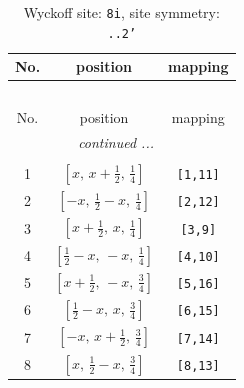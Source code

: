 \documentclass[fleqn,8pt]{jsarticle}
\begin{document}
\begin{longtable}{ccc}
\caption{Wyckoff site: {\tt 8i}, site symmetry: {\tt ..2'}}
 \\
 \hline \hline
No. & position & mapping \\ \hline \endfirsthead

\multicolumn{2}{l}{\tablename\ \thetable{}} \\
 \hline \hline
No. & position & mapping \\ \hline \endhead

 \hline \hline
\multicolumn{2}{r}{\footnotesize\it continued ...} \\ \endfoot

 \hline \hline
\multicolumn{2}{r}{} \\ \endlastfoot

1 & $\left[ x,\, x + \frac{1}{2},\, \frac{1}{4} \right]$ & {\tt [1,11]} \\ \hline
2 & $\left[ - x,\, \frac{1}{2} - x,\, \frac{1}{4} \right]$ & {\tt [2,12]} \\ \hline
3 & $\left[ x + \frac{1}{2},\, x,\, \frac{1}{4} \right]$ & {\tt [3,9]} \\ \hline
4 & $\left[ \frac{1}{2} - x,\, - x,\, \frac{1}{4} \right]$ & {\tt [4,10]} \\ \hline
5 & $\left[ x + \frac{1}{2},\, - x,\, \frac{3}{4} \right]$ & {\tt [5,16]} \\ \hline
6 & $\left[ \frac{1}{2} - x,\, x,\, \frac{3}{4} \right]$ & {\tt [6,15]} \\ \hline
7 & $\left[ - x,\, x + \frac{1}{2},\, \frac{3}{4} \right]$ & {\tt [7,14]} \\ \hline
8 & $\left[ x,\, \frac{1}{2} - x,\, \frac{3}{4} \right]$ & {\tt [8,13]} \\
\end{longtable}
\renewcommand{\arraystretch}{1.2}
\end{document}
